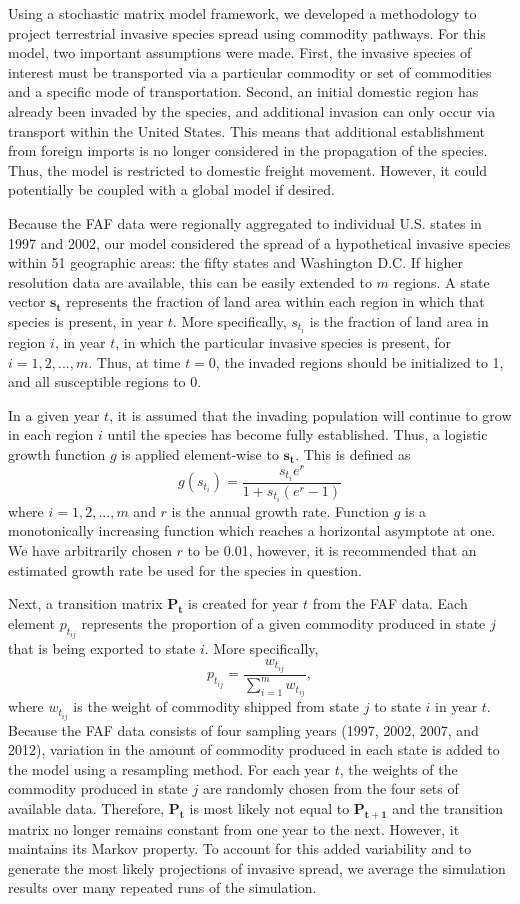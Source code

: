 \documentclass[12pt]{article}
\begin{document}
Using a stochastic matrix model framework, we developed a methodology to project terrestrial invasive species spread using commodity pathways.  For this model, two important assumptions were made.  First, the invasive species of interest must be transported via a particular commodity or set of commodities and a specific mode of transportation.  Second, an initial domestic region has already been invaded by the species, and additional invasion can only occur via transport within the United States.  This means that additional establishment from foreign imports is no longer considered in the propagation of the species.  Thus, the model is restricted to domestic freight movement. However, it could potentially be coupled with a global model if desired.

Because the FAF data were regionally aggregated to individual U.S. states in 1997 and 2002, our model considered the spread of a hypothetical invasive species within 51 geographic areas: the fifty states and Washington D.C.  If higher resolution data are available, this can be easily extended to $m$ regions.  A state vector $\mathbf{s_t}$ represents the fraction of land area within each region in which that species is present, in year $t$.  More specifically, $s_{t_i}$ is the fraction of land area in region $i$, in year $t$, in which the particular invasive species is present, for $i = 1,2,..., m$.  Thus, at time $t=0$, the invaded regions should be initialized to 1, and all susceptible regions to 0.    

In a given year $t$, it is assumed that the invading population will continue to grow in each region $i$ until the species has become fully established.  Thus, a logistic growth function $g$ is applied element-wise to $\mathbf{s_t}$.  This is defined as
\[ 
	g(s_{t_i}) = \frac{s_{t_i} e^r}{1+s_{t_i} (e^r-1)}
\]
where $i=1,2,...,m$ and $r$ is the annual growth rate. Function $g$ is a monotonically increasing function which reaches a horizontal asymptote at one. We have arbitrarily chosen $r$ to be 0.01, however, it is recommended that an estimated growth rate be used for the species in question.

Next, a transition matrix $\mathbf{P_t}$ is created for year $t$ from the FAF data.  Each element $p_{t_{ij}}$ represents the proportion of a given commodity produced in state $j$ that is being exported to state $i$.  More specifically, 
\[
p_{t_{ij}} = \frac{w_{t_{ij}}}{\sum_{i=1}^{m} w_{t_{ij}}},  
\]
where $w_{t_{ij}}$ is the weight of commodity shipped from state $j$ to state $i$ in year $t$.  Because the FAF data consists of four sampling years (1997, 2002, 2007, and 2012), variation in the amount of commodity produced in each state is added to the model using a resampling method.  For each year $t$, the weights of the commodity produced in state $j$ are randomly chosen from the four sets of available data.  Therefore, $\mathbf{P_t}$ is most likely not equal to $\mathbf{P_{t+1}}$ and the transition matrix no longer remains constant from one year to the next.  However, it maintains its Markov property.  To account for this added variability and to generate the most likely projections of invasive spread, we average the simulation results over many repeated runs of the simulation.
\end{document}
